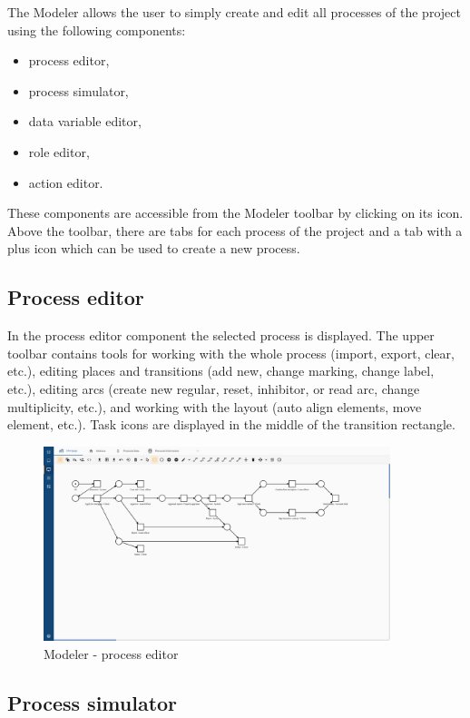 The Modeler allows the user to simply create and edit all processes of the project using the following components:
\begin{itemize}
  \item process editor,
  \item process simulator,
  \item data variable editor,
  \item role editor,
  \item action editor.
\end{itemize}
These components are accessible from the Modeler toolbar by clicking on its icon.
Above the toolbar, there are tabs for each process of the project and a tab with a plus icon which can be used to create a new process.

\subsection{Process editor}\label{subsec:process-editor}

In the process editor component the selected process is displayed.
The upper toolbar contains tools for working with the whole process (import, export, clear, etc.), editing places and transitions (add new, change marking, change label, etc.), editing arcs (create new regular, reset, inhibitor, or read arc, change multiplicity, etc.), and working with the layout (auto align elements, move element, etc.).
Task icons are displayed in the middle of the transition rectangle.

\begin{figure}[h!]
  \centering
  \includegraphics[width=0.9\textwidth]{images/modeler_process_editor.png}
  \caption{Modeler - process editor}
  \label{fig:modeler_process_editor}
\end{figure}

\subsection{Process simulator}\label{subsec:process-simulator}

